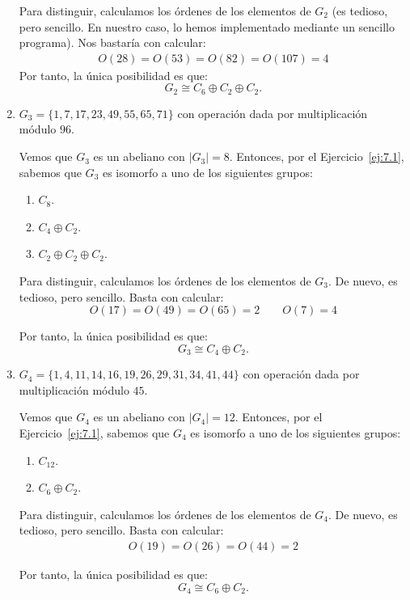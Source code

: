 \begin{ejercicio}
\begin{enumerate}
        Para distinguir, calculamos los órdenes de los elementos de $G_2$ (es tedioso, pero sencillo. En nuestro caso, lo hemos implementado mediante un sencillo programa). Nos bastaría con calcular:
        \begin{gather*}
            O(28)=O(53)=O(82)=O(107)=4
        \end{gather*}
        Por tanto, la única posibilidad es que:
        \begin{equation*}
            G_2 \cong C_6 \oplus C_2 \oplus C_2.
        \end{equation*}
        \item $G_3 = \{1, 7, 17, 23, 49, 55, 65, 71\}$ con operación dada por multiplicación módulo $96$.
        
        Vemos que $G_3$ es un abeliano con $|G_3| = 8$. Entonces, por el Ejercicio~\ref{ej:7.1}, sabemos que $G_3$ es isomorfo a uno de los siguientes grupos:
        \begin{enumerate}
            \item $C_8$.
            \item $C_4 \oplus C_2$.
            \item $C_2 \oplus C_2 \oplus C_2$.
        \end{enumerate}

        Para distinguir, calculamos los órdenes de los elementos de $G_3$. De nuevo, es tedioso, pero sencillo. Basta con calcular:
        \begin{equation*}
            O(17) = O(49) = O(65) = 2\qquad O(7)=4
        \end{equation*}

        Por tanto, la única posibilidad es que:
        \begin{equation*}
            G_3 \cong C_4 \oplus C_2.
        \end{equation*}
        \item $G_4 = \{1, 4, 11, 14, 16, 19, 26, 29, 31, 34, 41, 44\}$ con operación dada por multiplicación módulo $45$.
        
        Vemos que $G_4$ es un abeliano con $|G_4| = 12$. Entonces, por el Ejercicio~\ref{ej:7.1}, sabemos que $G_4$ es isomorfo a uno de los siguientes grupos:
        \begin{enumerate}
            \item $C_{12}$.
            \item $C_6 \oplus C_2$.
        \end{enumerate}
        Para distinguir, calculamos los órdenes de los elementos de $G_4$. De nuevo, es tedioso, pero sencillo. Basta con calcular:
        \begin{gather*}
            O(19)=O(26)=O(44)=2
        \end{gather*}

        Por tanto, la única posibilidad es que:
        \begin{equation*}
            G_4 \cong C_6 \oplus C_2.
        \end{equation*}
    \end{enumerate}
\end{ejercicio}

